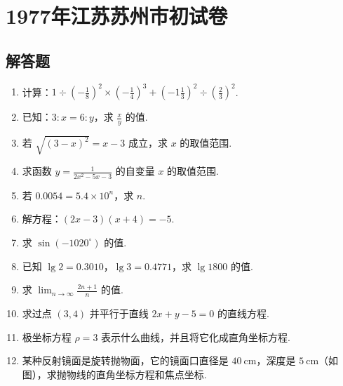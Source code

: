 \chapter{1977年江苏苏州市初试卷}

\section{解答题}

\begin{problem}
\begin{enumerate}
\item
计算：\( 1\div\left(-\frac{1}{8}\right)^2\times\left(-\frac{1}{4}\right)^3+\left(-1\frac{1}{3}\right)^2\div\left(\frac{2}{3}\right)^2 \).

\item
已知：\(3:x=6:y\)，求 \(\frac{x}{y}\) 的值.

\item
若 \(\sqrt{(3-x)^2}=x-3\) 成立，求 \(x\) 的取值范围.

\item
求函数 \(y=\frac{1}{2x^2-5x-3}\) 的自变量 \(x\) 的取值范围.

\item
若 \(0.0054=5.4\times10^n\)，求 \(n\).

\item
解方程：\((2x-3)(x+4)=-5\).

\item
求 \(\sin(-1020^\circ)\) 的值.

\item
已知 \(\lg2=0.3010\)，\(\lg3=0.4771\)，求 \(\lg1800\) 的值.

\item
求 \(\displaystyle\lim_{n\to\infty}\frac{2n+1}{n}\) 的值.

\item
求过点 \((3,4)\) 并平行于直线 \(2x+y-5=0\) 的直线方程.

\item
极坐标方程 \(\rho=3\) 表示什么曲线，并且将它化成直角坐标方程.

\item
某种反射镜面是旋转抛物面，它的镜面口直径是 \(40\mathrm{~cm}\)，深度是 \(5\mathrm{~cm}\)（如图），求抛物线的直角坐标方程和焦点坐标.

\end{enumerate}

\end{problem}

